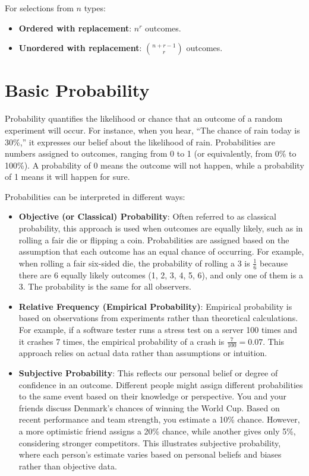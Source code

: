 \begin{proposition}
For selections from $n$ types:
\begin{itemize}
    \item \textbf{Ordered with replacement}: $n^r$ outcomes.
    \item \textbf{Unordered with replacement}: $\displaystyle \binom{n+r-1}{r}$ outcomes. %
\end{itemize}
\end{proposition}

\section{Basic Probability}
Probability quantifies the likelihood or chance that an outcome of a random experiment will occur. For instance, when you hear, “The chance of rain today is 30\%,” it expresses our belief about the likelihood of rain. Probabilities are numbers assigned to outcomes, ranging from 0 to 1 (or equivalently, from 0\% to 100\%). A probability of 0 means the outcome will not happen, while a probability of 1 means it will happen for sure.

Probabilities can be interpreted in different ways:

\begin{itemize}
    \item \textbf{Objective (or Classical) Probability}: Often referred to as classical probability, this approach is used when outcomes are equally likely, such as in rolling a fair die or flipping a coin. Probabilities are assigned based on the assumption that each outcome has an equal chance of occurring. For example, when rolling a fair six-sided die, the probability of rolling a 3 is \( \frac{1}{6} \) because there are 6 equally likely outcomes (1, 2, 3, 4, 5, 6), and only one of them is a 3. The probability is the same for all observers.
        
    \item \textbf{Relative Frequency (Empirical Probability)}: Empirical probability is based on observations from experiments rather than theoretical calculations. For example, if a software tester runs a stress test on a server 100 times and it crashes 7 times, the empirical probability of a crash is \( \frac{7}{100} = 0.07 \). This approach relies on actual data rather than assumptions or intuition.
        
    \item \textbf{Subjective Probability}: This reflects our personal belief or degree of confidence in an outcome. Different people might assign different probabilities to the same event based on their knowledge or perspective. You and your friends discuss Denmark’s chances of winning the World Cup. Based on recent performance and team strength, you estimate a 10\% chance. However, a more optimistic friend assigns a 20\% chance, while another gives only 5\%, considering stronger competitors. This illustrates subjective probability, where each person's estimate varies based on personal beliefs and biases rather than objective data.
    

\end{itemize}

